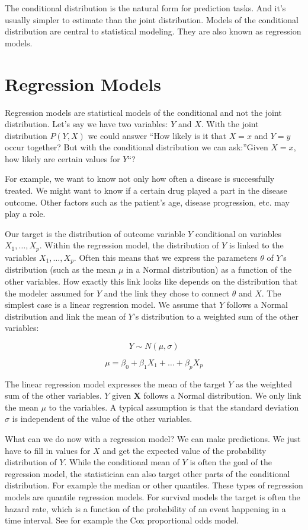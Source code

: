 \documentclass[
  10pt,
]{scrbook}
\begin{document}
The conditional distribution is the natural form for prediction tasks.
And it's usually simpler to estimate than the joint distribution.
Models of the conditional distribution are central to statistical modeling.
They are also known as regression models.

\hypertarget{regression-models}{%
\section{Regression Models}\label{regression-models}}

Regression models are statistical models of the conditional and not the joint distribution.
Let's say we have two variables: \(Y\) and \(X\).
With the joint distribution \(P(Y,X)\) we could answer ``How likely is it that \(X=x\) and \(Y=y\) occur together?
But with the conditional distribution we can ask:''Given \(X=x\), how likely are certain values for \(Y\)``?

For example, we want to know not only how often a disease is successfully treated.
We might want to know if a certain drug played a part in the disease outcome.
Other factors such as the patient's age, disease progression, etc. may play a role.

Our target is the distribution of outcome variable \(Y\) conditional on variables \(X_1, \ldots, X_p\).
Within the regression model, the distribution of \(Y\) is linked to the variables \(X_1, \ldots, X_p\).
Often this means that we express the parameters \(\theta\) of \(Y\)'s distribution (such as the mean \(\mu\) in a Normal distribution) as a function of the other variables.
How exactly this link looks like depends on the distribution that the modeler assumed for \(Y\) and the link they chose to connect \(\theta\) and \(X\).
The simplest case is a linear regression model.
We assume that \(Y\) follows a Normal distribution and link the mean of \(Y\)'s distribution to a weighted sum of the other variables:

\[Y \sim N(\mu, \sigma)\]

\[\mu = \beta_0 + \beta_1 X_1 + \ldots + \beta_p X_p\]

The linear regression model expresses the mean of the target \(Y\) as the weighted sum of the other variables.
\(Y\) given \(\mathbf{X}\) follows a Normal distribution.
We only link the mean \(\mu\) to the variables.
A typical assumption is that the standard deviation \(\sigma\) is independent of the value of the other variables.

What can we do now with a regression model?
We can make predictions.
We just have to fill in values for \(X\) and get the expected value of the probability distribution of \(Y\).
While the conditional mean of \(Y\) is often the goal of the regression model, the statistician can also target other parts of the conditional distribution.
For example the median or other quantiles.
These types of regression models are quantile regression models.
For survival models the target is often the hazard rate, which is a function of the probability of an event happening in a time interval.
See for example the Cox proportional odds model.
\end{document}
